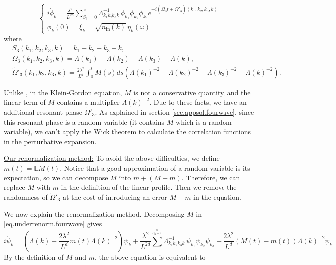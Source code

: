  
 \begin{equation}
\begin{cases}
 i \dot{\phi}_k = \frac{\lambda^2}{L^{2d}} \sum\limits^{\times}_{S_3=0} \Lambda_{k_1k_2k_3k}^{-1}\,\phi_{k_1}\overline{\phi}_{k_2} \phi_{k_3} e^{- i (\Omega_3t+\widetilde{\Omega}'_3)(k_1,k_2,k_3,k)} 
 \\[2em]
\phi_k(0) =\xi_k=\sqrt{n_{\textrm{in}}(k)} \, \eta_{k}(\omega)
\end{cases}
\end{equation}
where 
\begin{equation}
\begin{split}
 &S_3(k_1,k_2,k_3,k) = k_1 - k_2 + k_3 - k,
 \\
 &\Omega_3(k_1,k_2,k_3,k) =\Lambda(k_1)-\Lambda(k_2)+\Lambda(k_3)-\Lambda(k),
 \\
 &\widetilde{\Omega}'_3(k_1,k_2,k_3,k)=\frac{2\lambda^2}{L^{d}} \int^t_{0}M(s) ds\left(\Lambda(k_1)^{-2}-\Lambda(k_2)^{-2}+\Lambda(k_3)^{-2}-\Lambda(k)^{-2}\right).
\end{split}
\end{equation}

Unlike \cite{deng2021derivation}, in the Klein-Gordon equation, $M$ is not a conservative quantity, and the linear term of $M$ contains a multiplier $\Lambda(k)^{-2}$. Due to these facts, we have an additional resonant phase $\widetilde{\Omega}'_3$. As explained in section \ref{sec.appsol.fourwave}, since this resonant phase is a random variable (it contains $M$ which is a random variable), we can't apply the Wick theorem to calculate the correlation functions in the perturbative expansion.

\underline{Our renormalization method:} To avoid the above difficulties, we define $m(t)=\mathbb{E}M(t)$. Notice that a good approximation of a random variable is its expectation, so we can decompose $M$ into $m+(M-m)$. Therefore, we can replace $M$ with $m$ in the definition of the linear profile. Then we remove the randomness of $\widetilde{\Omega}'_3$ at the cost of introducing an error $M-m$ in the equation. 

We now explain the renormalization method. Decomposing $M$ in \eqref{eq.underrenorm.fourwave} gives
\begin{equation}\label{eq.underrenorm'.fourwave}
i \dot{\psi}_{k} 
= \left(\Lambda(k)+\frac{2\lambda^2}{L^{d}} m(t)\Lambda(k)^{-2}\right) \psi_k
+\frac{\lambda^2}{L^{2d}} \sum^{\times}\limits_{S_3=0} \Lambda_{k_1k_2k_3k}^{-1}\,\psi_{k_1}\overline{\psi}_{k_2} \psi_{k_3}+\frac{2\lambda^2}{L^{d}} (M(t)-m(t))\Lambda(k)^{-2} \psi_k
\end{equation}
By the definition of $M$ and $m$, the above equation is equivalent to 

